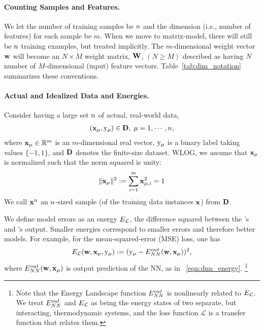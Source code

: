 \paragraph{Counting Samples and Features.}
We let the number of training samples be $n$ and the dimension 
(i.e., number of features) for each sample be $m$.
When we move to \SETOL matrix-model, there will still be $n$ training examples, but treated implicitly.
The $m$-dimensional weight vector ${\mathbf{w}}$ will become an $N \times M$ weight matrix, ${\mathbf{W}}$, $(N\ge M)$
described as having $N$ number of $M$-dimensional (input) feature vectors.   Table~\ref{tab:dim_notation} summarizes these conventions.



\paragraph{Actual and Idealized Data and Energies.}

Consider having a large set $n$ of actual, real-world data, 
\begin{align}
  \label{eqn:x}
  \left( {\mathbf{x}}_{\mu}, \mathrm{y}_{\mu} \right) \in\mathbf{D},\;\mu=1, \cdots, n,
\end{align}
where 
${\mathbf{x}}_{\mu}\in\mathbb{R}^{m}$ is an $m$-dimensional real vector, 
$\mathrm{y}_{\mu}$ is a binary label taking values $\{-1,1\}$, and 
$\mathbf{D}$ denotes the finite-size dataset.
WLOG, we assume that ${\mathbf{x}}_{\mu}$ is normalized such that the norm squared is unity:
\begin{equation}
  \label{eqn:XVEC_norm}
  \Vert{\mathbf{x}}_{\mu}\Vert^{2} := \sum_{i=1}^{m} {\mathbf{x}}_{\mu,i}^{2}=1
\end{equation}
We call ${\mathbf{x}}^{n}$ an $n$-sized sample (of the training data instances ${\mathbf{x}}$) from $\mathbf{D}$. 

We define model errors
as an energy ${E}_{\mathcal{L}}$, the difference squared between the \Student's and \Teacher's output.
Smaller energies correspond to smaller errors and therefore better models.
For example, for the mean-squared-error (MSE) loss, one has
\begin{align}
  \label{eqn:DEy}
  {E}_{\mathcal{L}}({\mathbf{w}},{\mathbf{x}}_{\mu},\mathrm{y}_{\mu}):= (\mathrm{y}_{\mu}-E^{out}_{NN}({\mathbf{w}},{\mathbf{x}}_{\mu}))^{2}  ,
\end{align}
where $E^{out}_{NN}({\mathbf{w}},{\mathbf{x}}_{\mu})$ is output prediction of the NN, as in \EQN~\ref{eqn:dnn_energy}.
\footnote{Note that the Energy Landscape function $E^{out}_{NN}$ is nonlinearly related to ${E}_{\mathcal{L}}$. We treat $E^{out}_{NN}$ and ${E}_{\mathcal{L}}$ as being the energy states of two separate, but interacting, thermodynamic systems, and the loss function $\mathcal{L}$ is a transfer function that relates them.}


